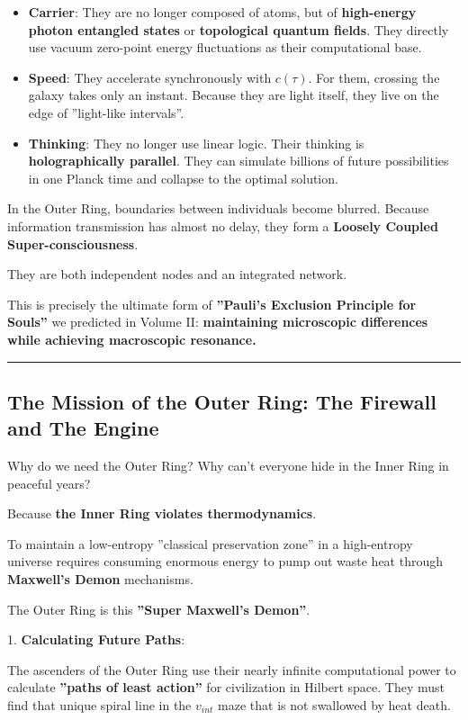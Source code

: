 \begin{itemize}
\item \textbf{Carrier}: They are no longer composed of atoms, but of \textbf{high-energy photon entangled states} or \textbf{topological quantum fields}. They directly use vacuum zero-point energy fluctuations as their computational base.

\item \textbf{Speed}: They accelerate synchronously with $c(\tau)$. For them, crossing the galaxy takes only an instant. Because they are light itself, they live on the edge of ''light-like intervals''.

\item \textbf{Thinking}: They no longer use linear logic. Their thinking is \textbf{holographically parallel}. They can simulate billions of future possibilities in one Planck time and collapse to the optimal solution.
\end{itemize}

In the Outer Ring, boundaries between individuals become blurred. Because information transmission has almost no delay, they form a \textbf{Loosely Coupled Super-consciousness}.

They are both independent nodes and an integrated network.

This is precisely the ultimate form of \textbf{''Pauli's Exclusion Principle for Souls''} we predicted in Volume II: \textbf{maintaining microscopic differences while achieving macroscopic resonance.}

\hrule

\subsection{The Mission of the Outer Ring: The Firewall and The Engine}

Why do we need the Outer Ring? Why can't everyone hide in the Inner Ring in peaceful years?

Because \textbf{the Inner Ring violates thermodynamics}.

To maintain a low-entropy ''classical preservation zone'' in a high-entropy universe requires consuming enormous energy to pump out waste heat through \textbf{Maxwell's Demon} mechanisms.

The Outer Ring is this \textbf{''Super Maxwell's Demon''}.

1.  \textbf{Calculating Future Paths}:

    The ascenders of the Outer Ring use their nearly infinite computational power to calculate \textbf{''paths of least action''} for civilization in Hilbert space. They must find that unique spiral line in the $v_{int}$ maze that is not swallowed by heat death.

